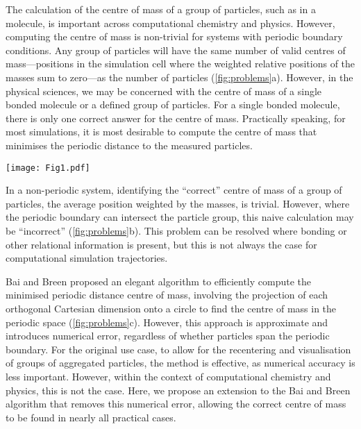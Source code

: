 \documentclass[reprint,superscriptaddress,nobibnotes,amsmath,amssymb,aip]{revtex4-2}
\begin{document}
The calculation of the centre of mass of a group of particles, such as in a molecule, is important across computational chemistry and physics.\cite{zhang_chemically_2024,happel_coordinated_2024,maggi_universality_2021,grillo_molecular_2023,bullerjahn_unwrapping_2023,jaeger-honz_systematic_2024}
However, computing the centre of mass is non-trivial for systems with periodic boundary conditions. 
Any group of particles will have the same number of valid centres of mass---positions in the simulation cell where the weighted relative positions of the masses sum to zero---as the number of particles (\cref{fig:problems}a). 
However, in the physical sciences, we may be concerned with the centre of mass of a single bonded molecule or a defined group of particles. 
For a single bonded molecule, there is only one correct answer for the centre of mass.
Practically speaking, for most simulations, it is most desirable to compute the centre of mass that minimises the periodic distance to the measured particles.
%
\begin{figure*}
  \texttt{[image: Fig1.pdf]}
  \caption{
  (a) Demonstration of the $N$ possible centres of mass in an $N$ particle system, where two periodic cells are visible, and the dashed line indicates the particle grouping that leads to a given centre of mass (cross). 
  (b) The problem with the naive centre of mass (red cross) calculation in periodic systems, where the particle group spans a periodic boundary. 
  (c) The projection of the particles in the bottom diagram of (b) onto a circle to find the centre of mass, which minimises the weighted distance to all particles.}
  \label{fig:problems}
\end{figure*}
%

In a non-periodic system, identifying the ``correct'' centre of mass of a group of particles, the average position weighted by the masses, is trivial. 
However, where the periodic boundary can intersect the particle group, this naive calculation may be ``incorrect'' (\cref{fig:problems}b). 
This problem can be resolved where bonding or other relational information is present, but this is not always the case for computational simulation trajectories. 

Bai and Breen proposed an elegant algorithm to efficiently compute the minimised periodic distance centre of mass,\cite{bai_calculating_2008} involving the projection of each orthogonal Cartesian dimension onto a circle to find the centre of mass in the periodic space (\cref{fig:problems}c). 
However, this approach is approximate and introduces numerical error, regardless of whether particles span the periodic boundary. 
For the original use case, to allow for the recentering and visualisation of groups of aggregated particles, the method is effective, as numerical accuracy is less important. 
However, within the context of computational chemistry and physics, this is not the case.  
Here, we propose an extension to the Bai and Breen algorithm that removes this numerical error, allowing the correct centre of mass to be found in nearly all practical cases. 
\end{document}
